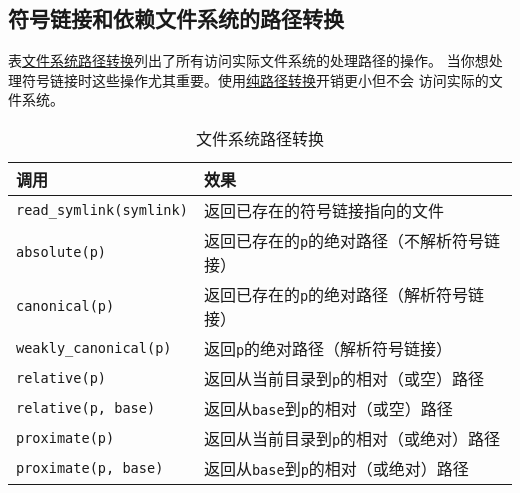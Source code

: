 \subsection{符号链接和依赖文件系统的路径转换}\label{ch20.4.5}
表\hyperref[t20.18]{文件系统路径转换}列出了所有访问实际文件系统的处理路径的操作。
当你想处理符号链接时这些操作尤其重要。使用\hyperref[ch20.3.3]{纯路径转换}开销更小但不会
访问实际的文件系统。
\begin{table}[htb]
    \centering
    \begin{tabular}{l|l}
        \hline
        \textbf{调用}                     & \textbf{效果}                           \\
        \hline
        \texttt{read\_symlink(symlink)} & 返回已存在的符号链接指向的文件                       \\
        \texttt{absolute(p)}            & 返回已存在的\texttt{p}的绝对路径（不解析符号链接）        \\
        \texttt{canonical(p)}           & 返回已存在的\texttt{p}的绝对路径（解析符号链接）         \\
        \texttt{weakly\_canonical(p)}   & 返回\texttt{p}的绝对路径（解析符号链接）             \\
        \texttt{relative(p)}            & 返回从当前目录到\texttt{p}的相对（或空）路径           \\
        \texttt{relative(p, base)}      & 返回从\texttt{base}到\texttt{p}的相对（或空）路径  \\
        \texttt{proximate(p)}           & 返回从当前目录到\texttt{p}的相对（或绝对）路径          \\
        \texttt{proximate(p, base)}     & 返回从\texttt{base}到\texttt{p}的相对（或绝对）路径 \\
        \hline
    \end{tabular}
    \caption{文件系统路径转换}
    \label{t20.18}
\end{table}

